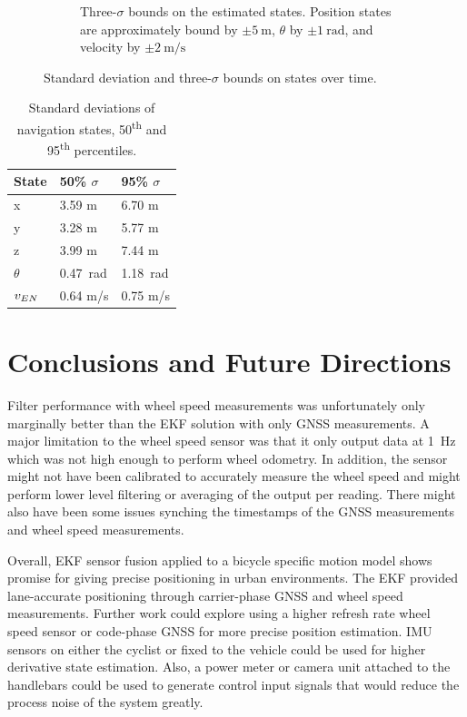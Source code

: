 \documentclass[letterpaper,times]{IONconf}
\begin{document}
\begin{figure}
\begin{subfigure}{.47\textwidth}
            \caption{Three-$\sigma$ bounds on the estimated states. Position states are approximately bound by $\pm\SI{5}{\m}$, $\theta$ by $\pm\SI{1}{\radian}$, and velocity by $\pm \SI{2}{\m\per\s}$ }
    \end{subfigure}
    \caption{Standard deviation and three-$\sigma $ bounds on states over time.} \label{fig:std}
\end{figure}

\begin{table}
    \centering
    \begin{tabular}{l|l|l}
        State & 50\% $\sigma$ & 95\% $\sigma$\\
        \hline\hline
        x & 3.59 m & 6.70 m\\
        y & 3.28 m & 5.77 m\\
        z & 3.99 m & 7.44 m\\
        $\theta$ & \SI{0.47}{\radian} & \SI{1.18}{\radian}\\
        $v_{EN}$ & 0.64 m/s & 0.75 m/s\\
    \end{tabular}
    \caption{Standard deviations of navigation states, 50\textsuperscript{th} and 95\textsuperscript{th} percentiles.}\label{tab:std}
\end{table}

\section{Conclusions and Future Directions}

Filter performance with wheel speed measurements was unfortunately only  marginally better than the EKF solution with only GNSS measurements. A major limitation to the wheel speed sensor was that it only output data at \SI{1}{\hertz} which was not high enough to perform wheel odometry. In addition, the sensor might not have been calibrated to accurately measure the wheel speed and might perform lower level filtering or averaging of the output per reading. There might also have been some issues synching the timestamps of the GNSS measurements and wheel speed measurements.

Overall, EKF sensor fusion applied to a bicycle specific motion model shows promise for giving precise positioning in urban environments. The EKF provided lane-accurate positioning through carrier-phase GNSS and wheel speed measurements. Further work could explore using a higher refresh rate wheel speed sensor or code-phase GNSS for more precise position estimation. IMU sensors on either the cyclist or fixed to the vehicle could be used for higher derivative state estimation. Also, a power meter or camera unit attached to the handlebars could be used to generate control input signals that would reduce the process noise of the system greatly. 


%
\printbibliography{}
\end{document}
